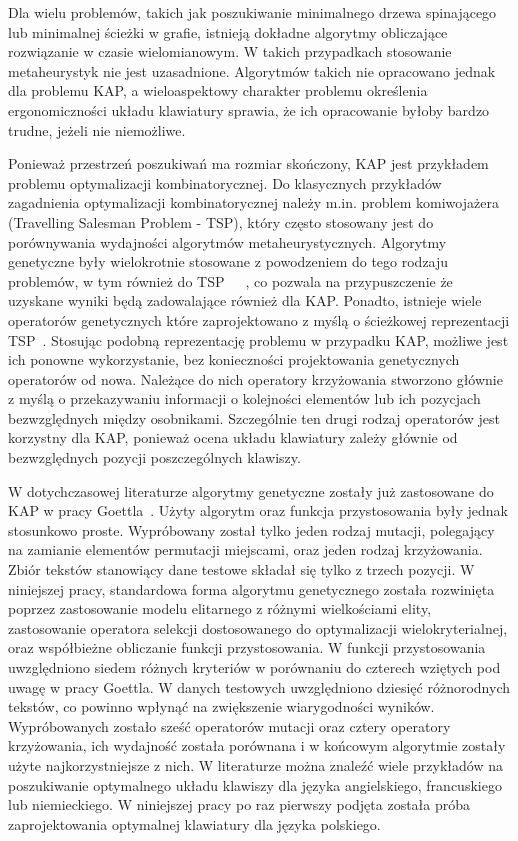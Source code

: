 \documentclass{xmgr}
\begin{document}
Dla wielu problemów, takich jak poszukiwanie minimalnego drzewa spinającego lub minimalnej ścieżki w grafie, istnieją dokładne algorytmy obliczające rozwiązanie w czasie wielomianowym. W takich przypadkach stosowanie metaheurystyk nie jest uzasadnione. Algorytmów takich nie opracowano jednak dla problemu KAP, a wieloaspektowy charakter problemu określenia ergonomiczności układu klawiatury sprawia, że ich opracowanie byłoby bardzo trudne, jeżeli nie niemożliwe.

Ponieważ przestrzeń poszukiwań ma rozmiar skończony, KAP jest przykładem problemu optymalizacji kombinatorycznej. Do klasycznych przykładów zagadnienia optymalizacji kombinatorycznej należy m.in. problem komiwojażera (Travelling Salesman Problem - TSP), który często stosowany jest do porównywania wydajności algorytmów metaheurystycznych. Algorytmy genetyczne były wielokrotnie stosowane z powodzeniem do tego rodzaju problemów, w tym również do TSP~\cite{Michalewicz:2003:AGSDPE}~\cite{Brady}~\cite{Stutzle:2000:CNI:645825.668943}, co pozwala na przypuszczenie że uzyskane wyniki będą zadowalające również dla KAP. Ponadto, istnieje wiele operatorów genetycznych które zaprojektowano z myślą o ścieżkowej reprezentacji TSP~\cite{Larranaga99geneticalgorithms}. Stosując podobną reprezentację problemu w przypadku KAP, możliwe jest ich ponowne wykorzystanie, bez konieczności projektowania genetycznych operatorów od nowa. Należące do nich operatory krzyżowania stworzono głównie z myślą o przekazywaniu informacji o kolejności elementów lub ich pozycjach bezwzględnych między osobnikami. Szczególnie ten drugi rodzaj operatorów jest korzystny dla KAP, ponieważ ocena układu klawiatury zależy głównie od bezwzględnych pozycji poszczególnych klawiszy.

W dotychczasowej literaturze algorytmy genetyczne zostały już zastosowane do KAP w pracy Goettla~\cite{Call:2005:CME}. Użyty algorytm oraz funkcja przystosowania były jednak stosunkowo proste. Wypróbowany został tylko jeden rodzaj mutacji, polegający na zamianie elementów permutacji miejscami, oraz jeden rodzaj krzyżowania. Zbiór tekstów stanowiący dane testowe składał się tylko z trzech pozycji. W niniejszej pracy, standardowa forma algorytmu genetycznego została rozwinięta poprzez zastosowanie modelu elitarnego z różnymi wielkościami elity, zastosowanie operatora selekcji dostosowanego do optymalizacji wielokryterialnej, oraz współbieżne obliczanie funkcji przystosowania. W funkcji przystosowania uwzględniono siedem różnych kryteriów w porównaniu do czterech wziętych pod uwagę w pracy Goettla. W danych testowych uwzględniono dziesięć różnorodnych tekstów, co powinno wpłynąć na zwiększenie wiarygodności wyników. Wypróbowanych zostało sześć operatorów mutacji oraz cztery operatory krzyżowania, ich wydajność została porównana i w końcowym algorytmie zostały użyte najkorzystniejsze z nich. W literaturze można znaleźć wiele przykładów na poszukiwanie optymalnego układu klawiszy dla języka angielskiego, francuskiego lub niemieckiego. W niniejszej pracy po raz pierwszy podjęta została próba zaprojektowania optymalnej klawiatury dla języka polskiego.
\end{document}
